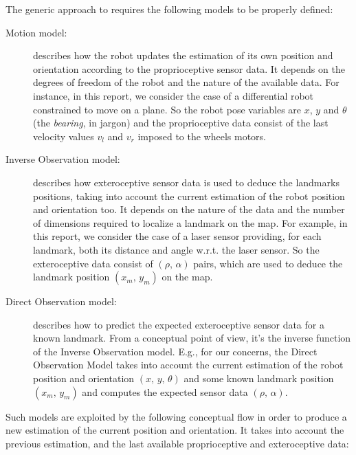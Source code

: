The generic approach to \SLAM{} requires the following models to be properly defined: 
\begin{description}
	\item[Motion model:] describes how the robot updates the estimation of its own position and orientation according to the proprioceptive sensor data. 
	It depends on the degrees of freedom of the robot and the nature of the available data. 
	For instance, in this report, we consider the case of a differential robot constrained to move on a plane. 
	So the robot pose variables are $x$, $y$ and $\theta$ (the \emph{bearing}, in jargon) and the proprioceptive data consist of the last velocity values $v_l$ and $v_r$ imposed to the wheels motors.

	\item[Inverse Observation model:] describes how exteroceptive sensor data is used to deduce the landmarks positions, taking into account the current estimation of the robot position and orientation too.
	It depends on the nature of the data and the number of dimensions required to localize a landmark on the map.
	For example, in this report, we consider the case of a laser sensor providing, for each landmark, both its distance and angle w.r.t. the laser sensor.
	So the exteroceptive data consist of $(\rho,\, \alpha)$ pairs, which are used to deduce the landmark position $(x_m,\, y_m)$ on the map.
	
	\item[Direct Observation model:] describes how to predict the expected exteroceptive sensor data for a known landmark.
	From a conceptual point of view, it's the inverse function of the Inverse Observation model. 
	E.g., for our concerns, the Direct Observation Model takes into account the current estimation of the robot position and orientation $(x,\, y,\, \theta)$ and some known landmark position $(x_m,\, y_m)$ and computes the expected sensor data $(\rho,\, \alpha)$.
\end{description}
Such models are exploited by the following conceptual flow in order to produce a new estimation of the current position and orientation. It takes into account the previous estimation, and the last available proprioceptive and exteroceptive data:
